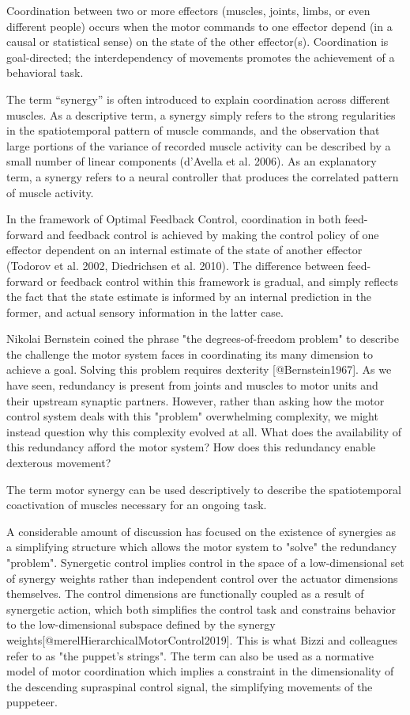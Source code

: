 \documentclass[../main.tex]{subfiles}
\begin{document}
{Coordination between two or more effectors (muscles, joints, limbs, or even different people) occurs when the motor commands to one effector depend (in a causal or statistical sense) on the state of the other effector(s). Coordination is goal-directed; the interdependency of movements promotes the achievement of a behavioral task. 

The term “synergy” is often introduced to explain coordination across different muscles. As a descriptive term, a synergy simply refers to the strong regularities in the spatiotemporal pattern of muscle commands, and the observation that large portions of the variance of recorded muscle activity can be described by a small number of linear components (d'Avella et al. 2006). As an explanatory term, a synergy refers to a neural controller that produces the correlated pattern of muscle activity. 

In the framework of Optimal Feedback Control, coordination in both feed-forward and feedback control is achieved by making the control policy of one effector dependent on an internal estimate of the state of another effector (Todorov et al. 2002, Diedrichsen et al. 2010). The difference between feed-forward or feedback control within this framework is gradual, and simply reflects the fact that the state estimate is informed by an internal prediction in the former, and actual sensory information in the latter case. 






 Nikolai Bernstein coined the phrase "the degrees-of-freedom problem" to describe the challenge the motor system faces in coordinating its many dimension to achieve a goal. Solving this problem requires dexterity [@Bernstein1967]. As we have seen, redundancy is present from joints and muscles to motor units and their upstream synaptic partners. However, rather than asking how the motor control system deals with this "problem" overwhelming complexity, we might instead question why this complexity evolved at all. What does the availability of this redundancy afford the motor system? How does this redundancy enable dexterous movement? 

 The term motor synergy can be used descriptively to describe the spatiotemporal coactivation of muscles necessary for an ongoing task. 

 A considerable amount of discussion has focused on the existence of synergies as a simplifying structure which allows the motor system to "solve" the redundancy "problem". Synergetic control implies control in the space of a low-dimensional set of synergy weights rather than independent control over the actuator dimensions themselves. The control dimensions are functionally coupled as a result of synergetic action, which both simplifies the control task and constrains behavior to the low-dimensional subspace defined by the synergy weights[@merelHierarchicalMotorControl2019]. This is what Bizzi and colleagues refer to as "the puppet's strings". The term can also be used as a normative model of motor coordination which implies a constraint in the dimensionality of the descending supraspinal control signal, the simplifying movements of the puppeteer. 

}
\end{document}
